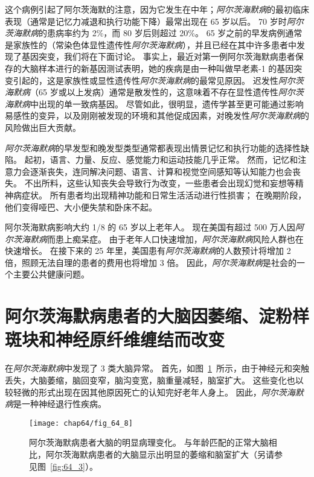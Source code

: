 这个病例引起了阿尔茨海默的注意，因为它发生在中年；\textit{阿尔茨海默病}的最初临床表现（通常是记忆力减退和执行功能下降）最常出现在 65 岁以后。
70 岁时\textit{阿尔茨海默病}的患病率约为 2\%，而 80 岁后则超过 20\%。
65 岁之前的早发病例通常是家族性的（常染色体显性遗传性\textit{阿尔茨海默病}），并且已经在其中许多患者中发现了基因突变，我们将在下面讨论。
事实上，最近对第一例阿尔茨海默病患者保存的大脑样本进行的新基因测试表明，她的疾病是由一种叫做早老素-1 的基因突变引起的，这是家族性或显性遗传性\textit{阿尔茨海默病}的最常见原因。
迟发性\textit{阿尔茨海默病}（65 岁或以上发病）通常是散发性的，这意味着不存在显性遗传性\textit{阿尔茨海默病}中出现的单一致病基因。
尽管如此，很明显，遗传学甚至更可能通过影响易感性的变异，以及刚刚被发现的环境和其他促成因素，对晚发性\textit{阿尔茨海默病}的风险做出巨大贡献。


\textit{阿尔茨海默病}的早发型和晚发型类型通常都表现出情景记忆和执行功能的选择性缺陷。
起初，语言、力量、反应、感觉能力和运动技能几乎正常。
然而，记忆和注意力会逐渐丧失，连同解决问题、语言、计算和视觉空间感知等认知能力也会丧失。
不出所料，这些认知丧失会导致行为改变，一些患者会出现幻觉和妄想等精神病症状。
所有患者均出现精神功能和日常生活活动进行性损害；
在晚期阶段，他们变得哑巴、大小便失禁和卧床不起。


阿尔茨海默病影响大约 1/8 的 65 岁以上老年人。
现在美国有超过 500 万人因\textit{阿尔茨海默病}而患上痴呆症。
由于老年人口快速增加，\textit{阿尔茨海默病}风险人群也在快速增长。
在接下来的 25 年里，美国患有\textit{阿尔茨海默病}的人数预计将增加 2 倍，照顾无法自理的患者的费用也将增加 3 倍。
因此，\textit{阿尔茨海默病}是社会的一个主要公共健康问题。



\section{阿尔茨海默病患者的大脑因萎缩、淀粉样斑块和神经原纤维缠结而改变}

在\textit{阿尔茨海默病}中发现了 3 类大脑异常。
首先，如图~\ref{fig:64_8}~所示，由于神经元和突触丢失，大脑萎缩，脑回变窄，脑沟变宽，脑重量减轻，脑室扩大。
这些变化也以较轻微的形式出现在因其他原因死亡的认知完好老年人身上。
因此，\textit{阿尔茨海默病}是一种神经退行性疾病。


\begin{figure}[htbp]
	\centering
	\texttt{[image: chap64/fig\_64\_8]}
	\caption{阿尔茨海默病患者大脑的明显病理变化。
		与年龄匹配的正常大脑相比，阿尔茨海默病患者的大脑显示出明显的萎缩和脑室扩大（另请参见图~\ref{fig:64_3}）。}
	\label{fig:64_8}
\end{figure}


